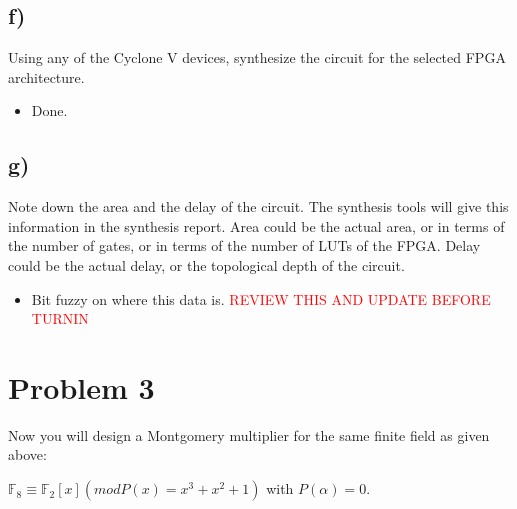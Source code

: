 \documentclass[a4paper,11pt]{exam}
\begin{document}
\subsection{f)}
\label{sec:org85464cf}
Using any of the Cyclone V devices, synthesize the circuit for the selected FPGA architecture.
\begin{itemize}
\item Done.
\end{itemize}

\subsection{g)}
\label{sec:orgee04339}
Note down the area and the delay of the circuit. The synthesis tools will give this information in the synthesis report. Area could be the actual area, or in terms of the number of gates, or in terms of the number of LUTs of the FPGA. Delay could be the actual delay, or the topological depth of the circuit.
\begin{itemize}
\item Bit fuzzy on where this data is. \textcolor{red}{REVIEW THIS AND UPDATE BEFORE TURNIN}
\end{itemize}

\section{Problem 3}
\label{sec:org495dea8}
Now you will design a Montgomery multiplier for the same finite field as given above: \\

\begin{center}
$\mathbb{F}_8 \equiv \mathbb{F}_2 [x] (mod P(x) = x^3 + x^2 + 1)$ with $P(\alpha) = 0$.
\end{center}
\end{document}
